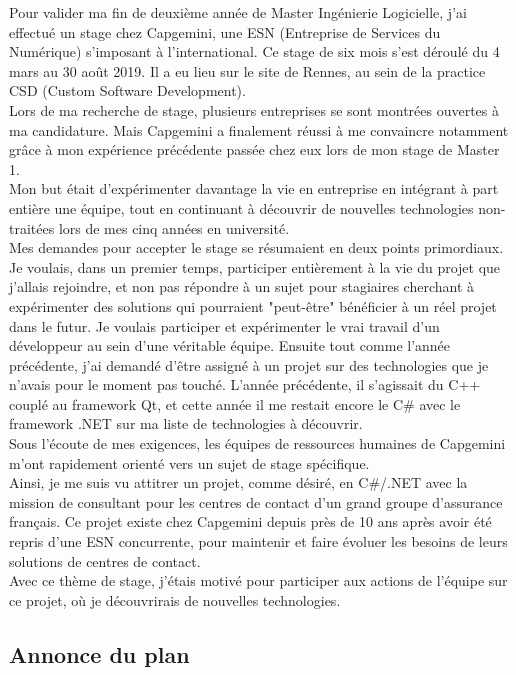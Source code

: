 \documentclass{rapport}
\begin{document}
Pour valider ma fin de deuxième année de Master Ingénierie Logicielle, j'ai effectué un stage chez Capgemini, une ESN (Entreprise de Services du Numérique) s'imposant à l'international. Ce stage de six mois s'est déroulé du 4 mars au 30 août 2019. Il a eu lieu sur le site de Rennes, au sein de la practice CSD (Custom Software Development).\\
Lors de ma recherche de stage, plusieurs entreprises se sont montrées ouvertes à ma candidature. Mais Capgemini a finalement réussi à me convaincre notamment grâce à mon expérience précédente passée chez eux lors de mon stage de Master 1.\\

Mon but était d'expérimenter davantage la vie en entreprise en intégrant à part entière une équipe, tout en continuant à découvrir de nouvelles technologies non-traitées lors de mes cinq années en université.\\
Mes demandes pour accepter le stage se résumaient en deux points primordiaux.
Je voulais, dans un premier temps, participer entièrement à la vie du projet que j'allais rejoindre, et non pas répondre à un sujet pour stagiaires cherchant à expérimenter des solutions qui pourraient "peut-être" bénéficier à un réel projet dans le futur. Je voulais participer et expérimenter le vrai travail d'un développeur au sein d'une véritable équipe.
Ensuite tout comme l'année précédente, j'ai demandé d'être assigné à un projet sur des technologies que je n'avais pour le moment pas touché. L'année précédente, il s'agissait du C++ couplé au framework Qt, et cette année il me restait encore le C\# avec le framework .NET sur ma liste de technologies à découvrir.\\

Sous l'écoute de mes exigences, les équipes de ressources humaines de Capgemini m'ont rapidement orienté vers un sujet de stage spécifique.\\
Ainsi, je me suis vu attitrer un projet, comme désiré, en C\#/.NET avec la mission de consultant pour les centres de contact d'un grand groupe d'assurance français. Ce projet existe chez Capgemini depuis près de 10 ans après avoir été repris d'une ESN concurrente, pour maintenir et faire évoluer les besoins de leurs solutions de centres de contact.\\
Avec ce thème de stage, j'étais motivé pour participer aux actions de l'équipe sur ce projet, où je découvrirais de nouvelles technologies.

\subsection*{Annonce du plan}
\end{document}
